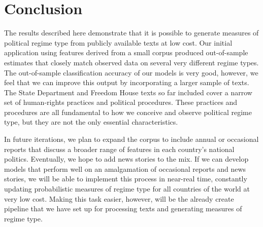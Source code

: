 \documentclass[pdftex,12pt,fullpage,oneside]{amsart}
\begin{document}
\section{Conclusion}

The results described here demonstrate that it is possible to generate measures of political regime type from publicly available texts at low cost. Our initial application using features derived from a small corpus produced out-of-sample estimates that closely match observed data on several very different regime types. The out-of-sample classification accuracy of our models is very good, however, we feel that we can improve this output by incorporating a larger sample of texts. The State Department and Freedom House texts so far included cover a narrow set of human-rights practices and political procedures. These practices and procedures are all fundamental to how we conceive and observe political regime type, but they are not the only essential characteristics.

In future iterations, we plan to expand the corpus to include annual or occasional reports that discuss a broader range of features in each country's national politics. Eventually, we hope to add news stories to the mix. If we can develop models that perform well on an amalgamation of occasional reports and news stories, we will be able to implement this process in near-real time, constantly updating probabilistic measures of regime type for all countries of the world at very low cost. Making this task easier, however, will be the already create pipeline that we have set up for processing texts and generating measures of regime type. 

\newpage


\end{document}
